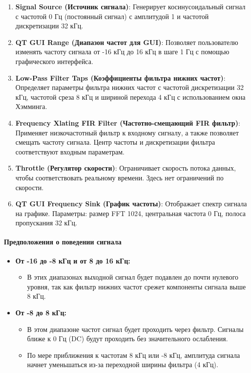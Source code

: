 \documentclass[a4paper,12pt]{extarticle}
\begin{document}
\begin{enumerate}
    \item \textbf{Signal Source (Источник сигнала)}: Генерирует косинусоидальный сигнал с частотой 0 Гц (постоянный сигнал) с амплитудой 1 и частотой дискретизации 32 кГц.
    \item \textbf{QT GUI Range (Диапазон частот для GUI)}: Позволяет пользователю изменять частоту сигнала от -16 кГц до 16 кГц в шаге 1 Гц с помощью графического интерфейса.
    \item \textbf{Low-Pass Filter Taps (Коэффициенты фильтра нижних частот)}: Определяет параметры фильтра нижних частот с частотой дискретизации 32 кГц, частотой среза 8 кГц и шириной перехода 4 кГц с использованием окна Хэмминга.
    \item \textbf{Frequency Xlating FIR Filter (Частотно-смещающий FIR фильтр)}: Применяет низкочастотный фильтр к входному сигналу, а также позволяет смещать частоту сигнала. Центр частоты и дискретизации фильтра соответствуют входным параметрам.
    \item \textbf{Throttle (Регулятор скорости)}: Ограничивает скорость потока данных, чтобы соответствовать реальному времени. Здесь нет ограничений по скорости.
    \item \textbf{QT GUI Frequency Sink (График частоты)}: Отображает спектр сигнала на графике. Параметры: размер FFT 1024, центральная частота 0 Гц, полоса пропускания 32 кГц.
\end{enumerate}

\paragraph{Предположения о поведении сигнала}
\begin{itemize}

    \item \textbf{От -16 до -8 кГц и от 8 до 16 кГц:}
    \begin{itemize}
        \item В этих диапазонах выходной сигнал будет подавлен до почти нулевого уровня, так как фильтр нижних частот срежет компоненты сигнала выше 8 кГц.
    \end{itemize}

    \item \textbf{От -8 до 8 кГц:}
    \begin{itemize}
        \item В этом диапазоне частот сигнал будет проходить через фильтр. Сигналы ближе к 0 Гц (DC) будут проходить без значительного ослабления.
        \item По мере приближения к частотам 8 кГц или -8 кГц, амплитуда сигнала начнет уменьшаться из-за переходной ширины фильтра (4 кГц).
    \end{itemize}

\end{itemize}
\end{document}
